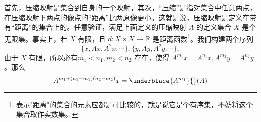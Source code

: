 首先，压缩映射是集合到自身的一个映射，其次，“压缩”是指对集合中任意两点，在压缩映射下两点的像点的“距离”比两原像更小。这就是说，压缩映射是定义在带有“距离”的集合上的。任意验证，满足上面定义的压缩映射 $A$ 的定义集合 $X$ 是个无限集。事实上，若 $X$ 有限，且 $d:X\times X\rightarrow \mathbb R$ 是距离函数\footnote{表示"距离"的集合的元素应都是可比较的，就是说它是个有序集，不妨将这个集合取作实数集。}。我们构建两个序列
\begin{equation}
\{x,Ax,A^2x,\cdots\},\{y,Ay,A^2y,\cdots\},
\end{equation}
由于 $X$ 有限，所以必有$m_1<n_1,m_2<n_2$ 存在，使得 $A^{m_1}x=A^{n_1}x,A^{m_2}y=A^{n_2}y$ 。那么
\begin{equation}
A^{m_1+(n_1-m_1)(n_2-m_2)}x=\underbtace{A^{m_1}}{}(A)
\end{equation}
